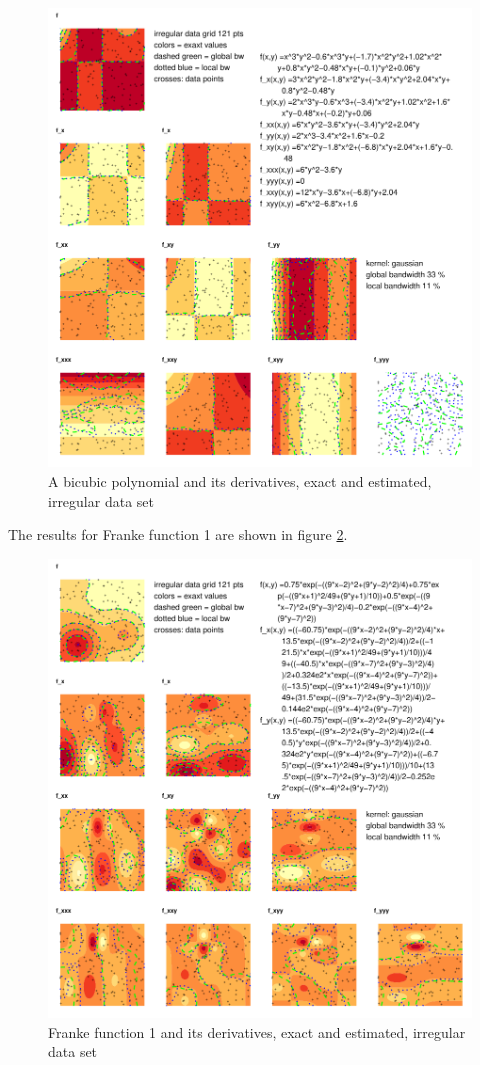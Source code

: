 \documentclass[nojss]{jss}
\begin{document}
\begin{figure}[htb]
\centering
\includegraphics{fig--036}
\caption{A bicubic polynomial and its derivatives, exact and estimated, irregular data set}
\label{fig:poly2}
\end{figure}
The results for Franke function 1 are shown in figure \ref{fig:franke12}. 
\begin{figure}[htb]
\centering
\includegraphics{fig--042}
\caption{Franke function 1 and its derivatives, exact and estimated, irregular data set}
\label{fig:franke12}
\end{figure}
\end{document}
